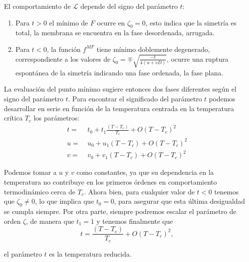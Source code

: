 El comportamiento de $\mathcal{L}$ depende del signo del parámetro $t$:

\begin{enumerate}
\item Para $t>0$ el mínimo de $F$ ocurre en $\zeta_0=0$, esto indica que la
  simetría es total, la membrana se encuentra en la fase desordenada,
  arrugada.
\item Para $t<0$, la función $f^{MF}$ tiene mínimo doblemente
  degenerado, correspondiente a los valores de $\zeta_0=\mp
  \sqrt{\frac{-t}{4(u+vD)}}$, ocurre una ruptura espontánea de la simetría indicando
  una fase ordenada, la fase plana.
\end{enumerate}

La evaluación del punto mínimo sugiere entonces dos fases diferentes según el
signo del parámetro $t$. Para encontrar el significado del parámetro $t$
podemos desarrollar en serie en función de la temperatura centrada en la
temperatura crítica $T_c$ los parámetros:
\begin{align}
t=&\; t_0+t_1\frac{(T-T_c)}{T_c}+O(T-T_c)^2\\
u=&\; u_0+u_1(T-T_c)+O(T-T_c)^2\\
v=&\; v_0+v_1(T-T_c)+O(T-T_c)^2
\end{align}

Podemos tomar a $u$ y $v$ como constantes, ya que su dependencia en la 
temperatura no contribuye en los primeros órdenes en comportamiento
termodinámico cerca de $T_c$. Ahora bien,
para cualquier valor de $t\!<\!0$ tenemos que $\zeta_0\!\neq\! 0$, lo que  
implica que $t_0=0$, para asegurar que esta última desigualdad se cumpla
siempre. Por otra parte, siempre podremos escalar el parámetro de orden
$\zeta$, de manera que $t_1=1$ y tenemos finalmente que
\begin{equation}
t=\frac{(T-T_c)}{T_c}+O(T-T_c)^2,
\end{equation}

el parámetro $t$ es la temperatura reducida.


 
